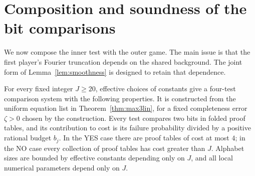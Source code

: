 \section{Composition and soundness of the bit comparisons}
\label{sec:composition}

We now compose the inner test with the outer game. The main issue is that the
first player's Fourier truncation depends on the shared background. The joint
form of Lemma~\ref{lem:smoothness} is designed to retain that dependence.

\begin{proposition}\label{prop:bit-gap}
For every fixed integer $J\ge20$, effective choices of constants give a
four-test comparison system with the following properties. It is constructed
from the uniform equation list in Theorem~\ref{thm:max3lin}, for a fixed
completeness error $\zeta>0$ chosen by the construction. Every test compares
two bits in folded proof tables, and its contribution to cost is its failure
probability divided by a positive rational budget $b_j$.
In the YES case there are proof tables of cost at most $4$; in the NO case
every collection of proof tables has cost greater than $J$.
Alphabet sizes are bounded by effective constants depending only on $J$,
and all local numerical parameters depend only on $J$.
\end{proposition}

